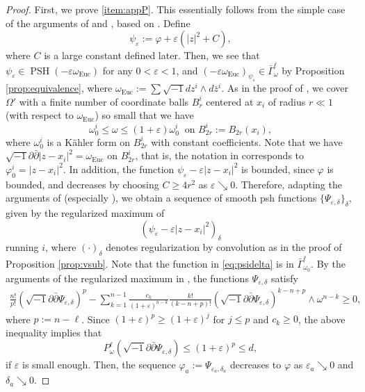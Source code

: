 \documentclass[10pt,a4paper]{amsart}
\numberwithin{equation}{section}
\newcommand{\delb}{\sqrt{-1}\partial\bar{\partial}}
\begin{document}
\begin{proof}
   First, we prove \ref{item:appP}. This essentially follows from the simple case of the arguments of \cite[Proposition 4.1]{Datar-Pingali} and \cite[Section 4]{GChen}, based on \cite{BK}. Define $$\psi_\varepsilon:=\varphi+\varepsilon(\vert z\vert^2+C),$$
   where $C$ is a large constant defined later. Then, we see that $\psi_\varepsilon\in\operatorname{PSH}(-\varepsilon\omega_\mathrm{Euc})$ for any $0<\varepsilon<1$, and $(-\varepsilon\omega_{\mathrm{Euc}})_{\psi_\varepsilon}\in\bar{\Gamma}^\ell_\omega$ by Proposition \ref{prop:equivalence}, where $\omega_\mathrm{Euc}:=\sum \sqrt{-1} dz^i\wedge d\bar{z}^i$.
   As in the proof of \cite[Proposition 4.1]{Datar-Pingali}, we cover $\Omega'$ with a finite number of coordinate balls $B^i_r$ centered at $x_i$ of radius $r\ll1$ (with respect to $\omega_\mathrm{Euc}$) so small that we have 
   \begin{equation}\label{eq:constomega}
       \omega_0^i\le\omega\le(1+\varepsilon)\omega_0^i\ \text { on } B^i_{2r}:=B_{2r}(x_i),
   \end{equation}
   where $\omega_0^i$ is a Kähler form on $B^i_{2r}$ with constant coefficients. Note that we have $\delb\vert z-x_i\vert^2=\omega_\mathrm{Euc}$ on $B^i_{2r}$, that is, the notation in \cite{Datar-Pingali} corresponds to $\varphi^i_0=\vert z-x_i\vert^2$. In addition, the function $\psi_\varepsilon-\varepsilon\vert z-x_i\vert^2$ is bounded, since $\varphi$ is bounded, and decreases by choosing $C\ge 4r^2$ as $\varepsilon\searrow0$. 
   Therefore, adapting the arguments of \cite[Proposition 4.1]{Datar-Pingali} (especially \cite[Proposition 4.1 (3)]{GChen}), we obtain a sequence of smooth psh functions $\{\Psi_{\varepsilon,\delta}\}_\delta$, given by the regularized maximum of 
   \begin{equation}\label{eq:psidelta}
       (\psi_\varepsilon-\varepsilon\vert z-x_i\vert^2)_{\delta}
   \end{equation}
   running $i$, where $(\cdot)_{\delta}$ denotes regularization by convolution as in the proof of Proposition \ref{prop:vsub}. Note that the function in \eqref{eq:psidelta} is in $\bar{\Gamma}_{\omega_0}^\ell$. By the arguments of the regularized maximum in \cite[p561--p562]{GChen}, the functions $\Psi_{\varepsilon,\delta}$ satisfy
   \begin{equation}\label{eq:appPineq}
       \begin{aligned}
           \frac{n!}{p!}(\delb\Psi_{\varepsilon,\delta})^p-\sum_{k=1}^{n-1}\frac{c_k}{(1+\varepsilon)^{n-k}}\frac{k!}{(k-n+p)!}(\delb\Psi_{\varepsilon,\delta})^{k-n+p}\wedge\omega^{n-k}\ge0,
       \end{aligned}
   \end{equation}
   where $p:=n-\ell$.
   Since $(1+\varepsilon)^p\ge(1+\varepsilon)^j$ for $j\le p$ and $c_k\ge0$, the above inequality implies that 
   \begin{equation}\label{eq:appPineq'}
       P^\ell_\omega(\delb\Psi_{\varepsilon,\delta})\le\left({1+\varepsilon}\right)^p\le d,
   \end{equation}
   if $\varepsilon$ is small enough.
   Then, the sequence $\varphi_a:=\Psi_{\varepsilon_a,\delta_a}$ decreases to $\varphi$ as $\varepsilon_a\searrow0$ and $\delta_a\searrow0$.


\end{proof}
\end{document}
